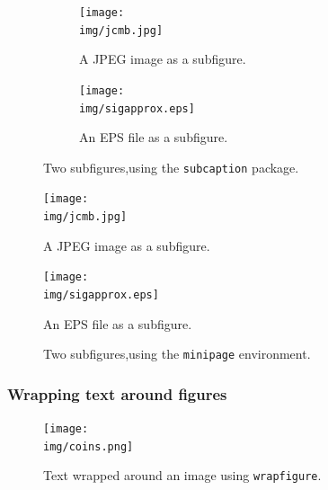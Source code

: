 \begin{figure}[H]
    \centering

    \begin{subfigure}{0.35\textwidth}
        \texttt{[image: \\img/jcmb.jpg]}
        \caption{A JPEG image as a subfigure.}
        \label{fig:jcmb}
    \end{subfigure}
    \hfill
    \begin{subfigure}{0.6\textwidth}
        \texttt{[image: \\img/sigapprox.eps]}
        \caption{An EPS file as a subfigure.}
        \label{fig:sig}
    \end{subfigure}
    \caption{Two subfigures,using the \texttt{subcaption} package.}
    \label{fig:subs}
\end{figure}



\begin{figure}[H]
    \centering
    \begin{minipage}{.35\textwidth}
        \centering
        \texttt{[image: \\img/jcmb.jpg]}
        \caption{A JPEG image as a subfigure.}
        \label{fig:mp-jcmb}
    \end{minipage}%
    \begin{minipage}{0.6\textwidth}
        \centering
        \texttt{[image: \\img/sigapprox.eps]}
        \caption{An EPS file as a subfigure.}
        \label{fig:mp-sig}
    \end{minipage}
    \caption{Two subfigures,using the \texttt{minipage} environment.}
    \label{fig:minpage}
\end{figure}


\subsubsection{Wrapping text around figures}
\label{float:wrap}

\begin{figure}
    \centering
    \texttt{[image: \\img/coins.png]}
    \caption{Text wrapped around an image using \texttt{wrapfigure}.}
    \label{fig:wrap}
\end{figure}

\lipsum[1-2]


